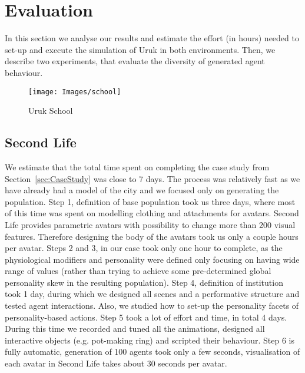 \documentclass[graybox]{svmult}
\begin{document}
\section{Evaluation}
\label{sec:evaluation}

In this section we analyse our results and estimate the effort (in hours) needed to set-up and execute the simulation of Uruk in both environments. Then, we describe two experiments, that evaluate the diversity of generated agent behaviour.


\begin{figure}[!ht]
    \centering
    \texttt{[image: Images/school]}
    \label{fig:school}
    \caption{Uruk School}
\end{figure}%

\subsection{Second Life}

We estimate that the total time spent on completing the case study from Section~\ref{sec:CaseStudy} was close to 7 days. The process was relatively fast as we have already had a model of the city and we focused only on generating the population. Step 1, definition of base population took us three days, where most of this time was spent on modelling clothing and attachments for avatars. Second Life provides parametric avatars with possibility to change more than 200 visual features. Therefore designing the body of the avatars took us only a couple hours per avatar. Steps 2 and 3, in our case took only one hour to complete, as the physiological modifiers and personality were defined only focusing on having wide range of values (rather than trying to achieve some pre-determined global personality skew in the resulting population). Step 4, definition of institution took 1 day, during which we designed all scenes and a performative structure and tested agent interactions. Also, we studied how to set-up the personality facets of personality-based actions. Step 5 took a lot of effort and time, in total 4 days. During this time we recorded and tuned all the animations, designed all interactive objects (e.g. pot-making ring) and scripted their behaviour. Step 6 is fully automatic, generation of 100 agents took only a few seconds, visualisation of each avatar in Second Life takes about 30 seconds per avatar. 

\end{document}
